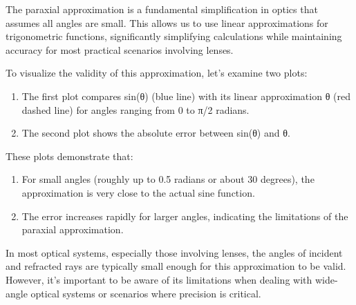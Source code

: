 \documentclass[
  a4paper,
]{book}
\providecommand{\tightlist}{%
  \setlength{\itemsep}{0pt}\setlength{\parskip}{0pt}}
\begin{document}
\begin{tcolorbox}[enhanced jigsaw, coltitle=black, title=\textcolor{quarto-callout-note-color}{\faInfo}\hspace{0.5em}{Paraxial Approximation}, colframe=quarto-callout-note-color-frame, toprule=.15mm, opacitybacktitle=0.6, left=2mm, opacityback=0, breakable, toptitle=1mm, bottomtitle=1mm, leftrule=.75mm, arc=.35mm, titlerule=0mm, colbacktitle=quarto-callout-note-color!10!white, rightrule=.15mm, bottomrule=.15mm, colback=white]

The paraxial approximation is a fundamental simplification in optics
that assumes all angles are small. This allows us to use linear
approximations for trigonometric functions, significantly simplifying
calculations while maintaining accuracy for most practical scenarios
involving lenses.

To visualize the validity of this approximation, let's examine two
plots:

\begin{enumerate}
\def\labelenumi{\arabic{enumi}.}
\tightlist
\item
  The first plot compares sin(θ) (blue line) with its linear
  approximation θ (red dashed line) for angles ranging from 0 to π/2
  radians.
\item
  The second plot shows the absolute error between sin(θ) and θ.
\end{enumerate}

These plots demonstrate that:

\begin{enumerate}
\def\labelenumi{\arabic{enumi}.}
\tightlist
\item
  For small angles (roughly up to 0.5 radians or about 30 degrees), the
  approximation is very close to the actual sine function.
\item
  The error increases rapidly for larger angles, indicating the
  limitations of the paraxial approximation.
\end{enumerate}

In most optical systems, especially those involving lenses, the angles
of incident and refracted rays are typically small enough for this
approximation to be valid. However, it's important to be aware of its
limitations when dealing with wide-angle optical systems or scenarios
where precision is critical.

\begin{figure}[H]


\end{figure}
\end{tcolorbox}
\end{document}

